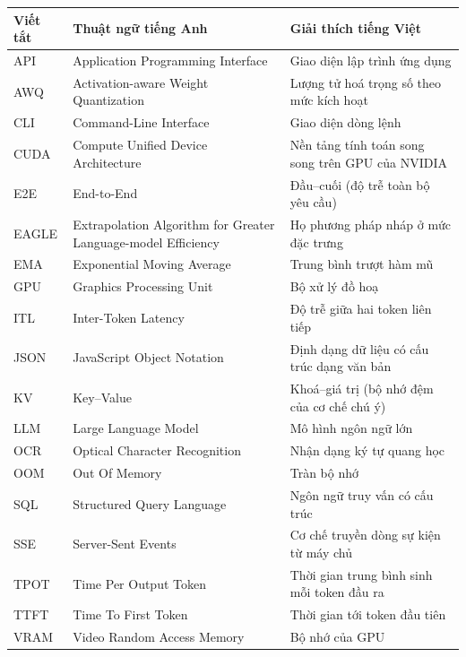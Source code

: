 \renewcommand{\arraystretch}{1.35}
\begin{longtable}{@{}p{21mm}>{\raggedright\arraybackslash}p{57mm}>{\raggedright\arraybackslash}p{63mm}@{}}
\toprule
\textbf{Viết tắt} & \textbf{Thuật ngữ tiếng Anh} & \textbf{Giải thích tiếng Việt}\\
\midrule
\endhead
API & Application Programming Interface & Giao diện lập trình ứng dụng\\
AWQ & Activation-aware Weight Quantization & Lượng tử hoá trọng số theo mức kích hoạt\\
CLI & Command-Line Interface & Giao diện dòng lệnh\\
CUDA & Compute Unified Device Architecture & Nền tảng tính toán song song trên GPU của NVIDIA\\
E2E & End-to-End & Đầu--cuối (độ trễ toàn bộ yêu cầu)\\
EAGLE & Extrapolation Algorithm for Greater Language-model Efficiency & Họ phương pháp nháp ở mức đặc trưng\\
EMA & Exponential Moving Average & Trung bình trượt hàm mũ\\
GPU & Graphics Processing Unit & Bộ xử lý đồ hoạ\\
ITL & Inter-Token Latency & Độ trễ giữa hai token liên tiếp\\
JSON & JavaScript Object Notation & Định dạng dữ liệu có cấu trúc dạng văn bản\\
KV & Key--Value & Khoá--giá trị (bộ nhớ đệm của cơ chế chú ý)\\
LLM & Large Language Model & Mô hình ngôn ngữ lớn\\
OCR & Optical Character Recognition & Nhận dạng ký tự quang học\\
OOM & Out Of Memory & Tràn bộ nhớ\\
SQL & Structured Query Language & Ngôn ngữ truy vấn có cấu trúc\\
SSE & Server-Sent Events & Cơ chế truyền dòng sự kiện từ máy chủ\\
TPOT & Time Per Output Token & Thời gian trung bình sinh mỗi token đầu ra\\
TTFT & Time To First Token & Thời gian tới token đầu tiên\\
VRAM & Video Random Access Memory & Bộ nhớ của GPU\\
\bottomrule
\end{longtable}
